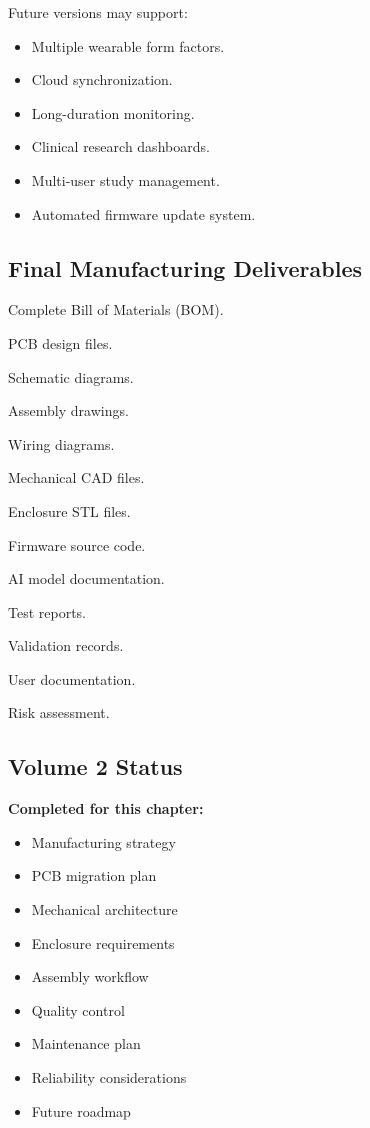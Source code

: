 Future versions may support:
\begin{itemize}
    \item Multiple wearable form factors.
    \item Cloud synchronization.
    \item Long-duration monitoring.
    \item Clinical research dashboards.
    \item Multi-user study management.
    \item Automated firmware update system.
\end{itemize}

\subsection{Final Manufacturing Deliverables}
\label{sec:final-manufacturing-deliverables}

\begin{checklist}
    \item Complete Bill of Materials (BOM).
    \item PCB design files.
    \item Schematic diagrams.
    \item Assembly drawings.
    \item Wiring diagrams.
    \item Mechanical CAD files.
    \item Enclosure STL files.
    \item Firmware source code.
    \item AI model documentation.
    \item Test reports.
    \item Validation records.
    \item User documentation.
    \item Risk assessment.
\end{checklist}

\subsection{Volume 2 Status}
\label{sec:volume2-status}

\begin{validationbox}
\textbf{Completed for this chapter:}
\begin{itemize}
    \item Manufacturing strategy
    \item PCB migration plan
    \item Mechanical architecture
    \item Enclosure requirements
    \item Assembly workflow
    \item Quality control
    \item Maintenance plan
    \item Reliability considerations
    \item Future roadmap
\end{itemize}
\end{validationbox}
